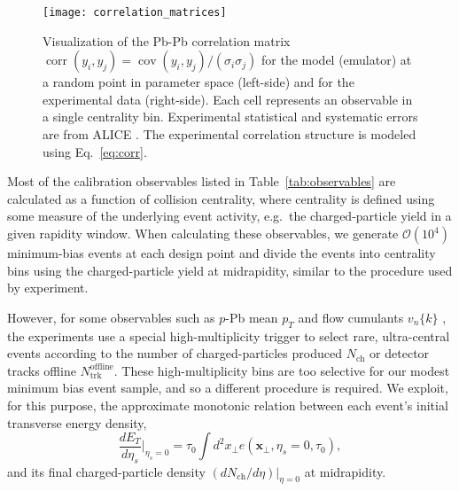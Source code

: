 \documentclass[aps,prc,reprint,amsmath,nofootinbib]{revtex4-1}
\newcommand{\nch}{N_\text{ch}}
\newcommand{\ntrk}{N_\text{trk}^\text{offline}}
\newcommand{\vnk}[2]{v_#1\{#2\}}
\newcommand{\xv}{\mathbf x}
\newcommand{\order}[1]{$\mathcal O(10^{#1})$}
\DeclareMathOperator{\cov}{cov}
\DeclareMathOperator{\corr}{corr}
\begin{document}
\begin{figure}[t]
  \texttt{[image: correlation\_matrices]}
  \caption{
    \label{fig:correlation}
    Visualization of the Pb-Pb correlation matrix $\corr(y_i, y_j) = \cov(y_i,y_j)/(\sigma_i \sigma_j)$ for the model (emulator) at a random point in parameter space (left-side) and for the experimental data (right-side).
    Each cell represents an observable in a single centrality bin. Experimental statistical and systematic errors are from ALICE \cite{Adam:2015ptt, Adam:2016izf}.
    The experimental correlation structure is modeled using Eq.~\eqref{eq:corr}.
  }
\end{figure}

Most of the calibration observables listed in Table~\ref{tab:observables} are calculated as a function of collision centrality, where centrality is defined using some measure of the underlying event activity, e.g.\ the charged-particle yield in a given rapidity window.
When calculating these observables, we generate \order{4} minimum-bias events at each design point and divide the events into centrality bins using the charged-particle yield at midrapidity, similar to the procedure used by experiment.

However, for some observables such as $p$-Pb mean $p_T$ \cite{Abelev:2013bla} and flow cumulants $\vnk{n}{k}$ \cite{Chatrchyan:2013nka}, the experiments use a special high-multiplicity trigger to select rare, ultra-central events according to the number of charged-particles produced $\nch$ or detector tracks offline $\ntrk$.
These high-multiplicity bins are too selective for our modest minimum bias event sample, and so a different procedure is required.
We exploit, for this purpose, the approximate monotonic relation between each event's initial transverse energy density,
\begin{equation}
  \frac{dE_T}{d\eta_s} \bigg\vert_{\eta_s=0} = \tau_0 \int d^2x_\perp e(\xv_\perp, \eta_s=0, \tau_0),
\end{equation}
and its final charged-particle density $(d\nch/d\eta) \vert_{\eta=0}$ at midrapidity.
\end{document}
